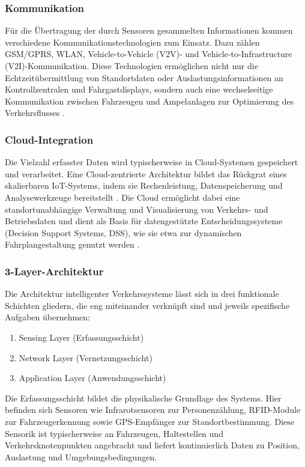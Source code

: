 \subsubsection{Kommunikation}
Für die Übertragung der durch Sensoren gesammelten Informationen kommen verschiedene Kommunikationstechnologien zum Einsatz. Dazu zählen GSM/GPRS, WLAN, Vehicle-to-Vehicle (V2V)- und Vehicle-to-Infrastructure (V2I)-Kommunikation. Diese Technologien ermöglichen nicht nur die Echtzeitübermittlung von Standortdaten oder Auslastungsinformationen an Kontrollzentralen und Fahrgastdisplays, sondern auch eine wechselseitige Kommunikation zwischen Fahrzeugen und Ampelanlagen zur Optimierung des Verkehrsflusses \cite{Elkosantini2013} \cite{Guo2019}.

\subsubsection{Cloud-Integration}
Die Vielzahl erfasster Daten wird typischerweise in Cloud-Systemen gespeichert und verarbeitet. Eine Cloud-zentrierte Architektur bildet das Rückgrat eines skalierbaren IoT-Systems, indem sie Rechenleistung, Datenspeicherung und Analysewerkzeuge bereitstellt \cite{Gubbi2013}. Die Cloud ermöglicht dabei eine standortunabhängige Verwaltung und Visualisierung von Verkehrs- und Betriebsdaten und dient als Basis für datengestützte Entscheidungssysteme (Decision Support Systems, DSS), wie sie etwa zur dynamischen Fahrplangestaltung genutzt werden \cite{Luo2019}.

\subsubsection{3-Layer-Architektur}
Die Architektur intelligenter Verkehrssysteme lässt sich in drei funktionale Schichten gliedern, die eng miteinander verknüpft sind und jeweils spezifische Aufgaben übernehmen:

\begin{enumerate}
    \item Sensing Layer (Erfassungsschicht)
    \item Network Layer (Vernetzungsschicht)
    \item Application Layer (Anwendungsschicht)
\end{enumerate}

Die Erfassungsschicht bildet die physikalische Grundlage des Systems. Hier befinden sich Sensoren wie Infrarotsensoren zur Personenzählung, RFID-Module zur Fahrzeugerkennung sowie GPS-Empfänger zur Standortbestimmung. Diese Sensorik ist typischerweise an Fahrzeugen, Haltestellen und Verkehrsknotenpunkten angebracht und liefert kontinuierlich Daten zu Position, Auslastung und Umgebungsbedingungen.

